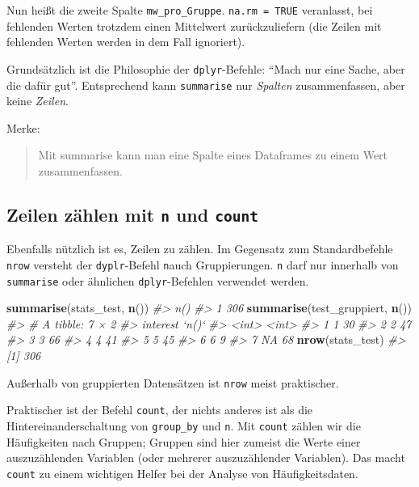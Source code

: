 \documentclass[12pt,]{book}
\newenvironment{Shaded}{\begin{snugshade}}{\end{snugshade}}
\newcommand{\KeywordTok}[1]{\textcolor[rgb]{0.13,0.29,0.53}{\textbf{{#1}}}}
\newcommand{\CommentTok}[1]{\textcolor[rgb]{0.56,0.35,0.01}{\textit{{#1}}}}
\newcommand{\NormalTok}[1]{{#1}}
\begin{document}
Nun heißt die zweite Spalte \texttt{mw\_pro\_Gruppe}.
\texttt{na.rm\ =\ TRUE} veranlasst, bei fehlenden Werten trotzdem einen
Mittelwert zurückzuliefern (die Zeilen mit fehlenden Werten werden in
dem Fall ignoriert).

Grundsätzlich ist die Philosophie der \texttt{dplyr}-Befehle: ``Mach nur
eine Sache, aber die dafür gut''. Entsprechend kann \texttt{summarise}
nur \emph{Spalten} zusammenfassen, aber keine \emph{Zeilen}.

Merke:

\begin{quote}
Mit summarise kann man eine Spalte eines Dataframes zu einem Wert
zusammenfassen.
\end{quote}

\subsection{\texorpdfstring{Zeilen zählen mit \texttt{n} und
\texttt{count}}{Zeilen zählen mit n und count}}\label{zeilen-zahlen-mit-n-und-count}

Ebenfalls nützlich ist es, Zeilen zu zählen. Im Gegensatz zum
Standardbefehle \texttt{nrow} versteht der \texttt{dyplr}-Befehl
\texttt{n}auch Gruppierungen. \texttt{n} darf nur innerhalb von
\texttt{summarise} oder ähnlichen \texttt{dplyr}-Befehlen verwendet
werden.

\begin{Shaded}
\begin{Highlighting}[]
\KeywordTok{summarise}\NormalTok{(stats_test, }\KeywordTok{n}\NormalTok{())}
\CommentTok{#>   n()}
\CommentTok{#> 1 306}
\KeywordTok{summarise}\NormalTok{(test_gruppiert, }\KeywordTok{n}\NormalTok{())}
\CommentTok{#> # A tibble: 7 × 2}
\CommentTok{#>   interest `n()`}
\CommentTok{#>      <int> <int>}
\CommentTok{#> 1        1    30}
\CommentTok{#> 2        2    47}
\CommentTok{#> 3        3    66}
\CommentTok{#> 4        4    41}
\CommentTok{#> 5        5    45}
\CommentTok{#> 6        6     9}
\CommentTok{#> 7       NA    68}
\KeywordTok{nrow}\NormalTok{(stats_test)}
\CommentTok{#> [1] 306}
\end{Highlighting}
\end{Shaded}

Außerhalb von gruppierten Datensätzen ist \texttt{nrow} meist
praktischer.

Praktischer ist der Befehl \texttt{count}, der nichts anderes ist als
die Hintereinanderschaltung von \texttt{group\_by} und \texttt{n}. Mit
\texttt{count} zählen wir die Häufigkeiten nach Gruppen; Gruppen sind
hier zumeist die Werte einer auszuzählenden Variablen (oder mehrerer
auszuzählender Variablen). Das macht \texttt{count} zu einem wichtigen
Helfer bei der Analyse von Häufigkeitsdaten.
\end{document}
